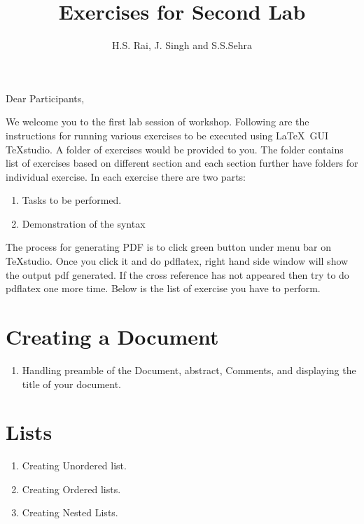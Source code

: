 \documentclass[11pt,a4paper]{article}
\author{H.S. Rai, J. Singh and S.S.Sehra}
\title{Exercises for Second Lab}
\begin{document}
\maketitle
Dear Participants,

We welcome you to the  first lab session of workshop. Following are the instructions for running various exercises to be executed using \LaTeX\ GUI \TeX studio. A folder of exercises would be provided to you. The folder contains list of exercises based on different section and each section further have folders for individual exercise. In each exercise there are two parts:
\begin{enumerate}
\item  Tasks to be performed.
\item Demonstration of the syntax
\end{enumerate}

The process for generating PDF is to click green button under menu bar on \TeX studio. Once you click it and do pdflatex, right hand side window will  show the output pdf generated. If the cross reference has not appeared then try to do pdflatex one more time. Below is the list of exercise you have to perform.

 
\section{Creating a Document}
 \begin{enumerate}
 \item Handling preamble of the Document, abstract, Comments, and displaying the title of your document. 
 
 \end{enumerate}
\section{Lists}
 \begin{enumerate}
 \item Creating Unordered list.
 \item Creating Ordered lists.
 \item Creating Nested Lists.
 \end{enumerate}
\end{document}
